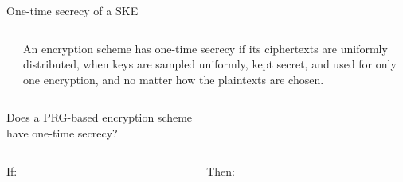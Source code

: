 \documentclass[aspectratio=169, lualatex, handout]{beamer}
\begin{document}
\begin{frame}{One-time secrecy of a SKE}
	\begin{columns}[c]
		\begin{column}{0.5\textwidth}
		\end{column}
		\begin{column}{0.5\textwidth}
			An encryption scheme has one-time secrecy if its ciphertexts are uniformly distributed, when keys are sampled uniformly, kept secret, and used for only one encryption, and no matter how the plaintexts are chosen.
		\end{column}
	\end{columns}
\end{frame}

\begin{frame}{Does a PRG-based encryption scheme\\ have one-time secrecy?}
	\begin{columns}[c]
		\begin{column}{0.5\textwidth}
			If:
		\end{column}
		\begin{column}{0.5\textwidth}
			Then:
		\end{column}
	\end{columns}
\end{frame}
\end{document}
